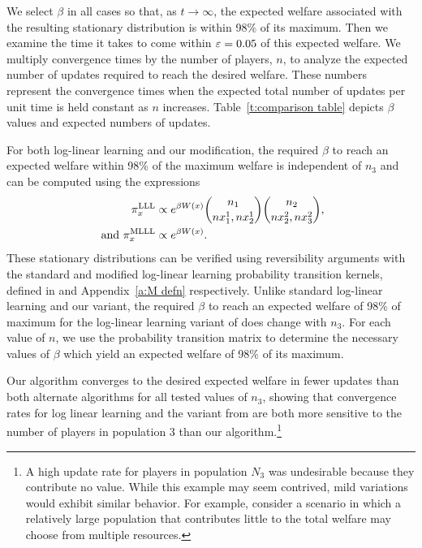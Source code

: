 \begin{example}
We select $\beta$ in all cases so that, as $t\to\infty$, the expected welfare associated with the resulting stationary distribution is within 98\% of its maximum. Then we examine the time it takes to come within $\varepsilon = 0.05$ of this expected welfare. We multiply convergence times by the number of players, $n$, to analyze the expected number of updates required to reach the desired welfare. These numbers represent the convergence times when the expected total number of updates per unit time is held constant as $n$ increases. Table~\ref{t:comparison table} depicts $\beta$ values and expected numbers of updates.

For both log-linear learning and our modification, the required $\beta$ to reach an expected welfare within 98\% of the maximum welfare is independent of $n_3$ and can be computed using the expressions 
\begin{align}
\pi_x^{\rm LLL} &\propto e^{\beta W(x)}{n_1 \choose nx_1^1, nx_2^1}{n_2 \choose nx_2^2, nx_3^2},\\%
\text{ and }\pi_x^{\rm MLLL} &\propto e^{\beta W(x)}.%
\end{align}
These stationary distributions can be verified using reversibility arguments with the standard and modified log-linear learning probability transition kernels, defined in \cite{Shah2010} and Appendix~\ref{a:M defn} respectively. 
Unlike standard log-linear learning and our variant, the required $\beta$ to reach an expected welfare of 98\% of maximum for the log-linear learning variant of \cite{Shah2010} does change with $n_3.$ For each value of $n$, we use the probability transition matrix to  determine the necessary values of $\beta$ which yield an expected welfare of 98\% of its maximum.


Our algorithm converges to the desired expected welfare in fewer updates than both alternate algorithms for all tested values of $n_3$, showing that convergence rates for log linear learning and the variant from \cite{Shah2010} are both more sensitive to the number of players in population 3 than our algorithm.\footnote{A high update rate for players in population $N_3$ was undesirable because they contribute no value. While this example may seem contrived, mild variations would exhibit similar behavior. For example, consider a scenario in which a relatively large population that contributes little to the total welfare may choose from multiple resources.}



\end{example}
